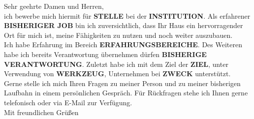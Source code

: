 \subject{Bewerbung als Position}
\coverletter[sender=true, vspace=4mm]

Sehr geehrte Damen und Herren, \\

ich bewerbe mich hiermit für 
\textbf{STELLE} bei der 
\textbf{INSTITUTION}. 
Als erfahrener 
\textbf{BISHERIGER JOB} 
bin ich zuversichtlich, dass Ihr Haus ein hervorragender Ort für mich ist, meine Fähigkeiten zu nutzen und noch weiter auszubauen.\\

Ich habe Erfahrung im Bereich 
\textbf{ERFAHRUNGSBEREICHE}.
Des Weiteren habe ich bereits Verantwortung übernehmen dürfen 
\textbf{BISHERIGE VERANTWORTUNG}. 
Zuletzt habe ich mit dem Ziel der 
\textbf{ZIEL}, unter Verwendung von 
\textbf{WERKZEUG}, Unternehmen bei 
\textbf{ZWECK} unterstützt.\\

Gerne stelle ich mich Ihren Fragen zu meiner Person und zu meiner bisherigen Laufbahn in einem persönlichen Gespräch. Für Rückfragen stehe ich Ihnen gerne telefonisch oder via E-Mail zur Verfügung. \\

Mit freundlichen Grüßen
